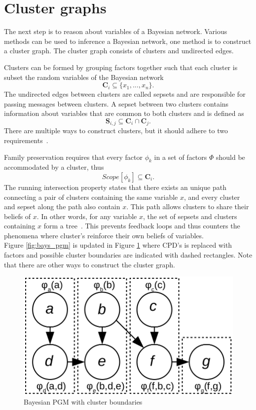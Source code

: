 \documentclass[12pt,oneside,openany,a4paper, %
afrikaans,english,
]{memoir}
\numberwithin{equation}{chapter}
\begin{document}
\section{Cluster graphs}
The next step is to reason about variables of a Bayesian network. Various methods can be used to inference a Bayesian network, one method is to construct a cluster graph. The cluster graph consists of clusters and undirected edges.

Clusters can be formed by grouping factors together such that each cluster is subset the random variables of the Bayesian network
\begin{equation}
\bm{C}_i \subseteq \{x_1, ..., x_n\}.
\end{equation}
The undirected edges between clusters are called sepsets and are responsible for passing messages between clusters. A sepset between two clusters contains information about variables that are common to both clusters and is defined as
\begin{equation}
\bm{S}_{i,j} \subseteq \bm{C}_i \cap \bm{C}_j.
\end{equation}
There are multiple ways to construct clusters, but it should adhere to two requirements~\citep{koller}.

Family preservation requires that every factor $\phi_k$ in a set of factors $\Phi$ should be accommodated by a cluster, thus
\begin{equation}
Scope[{\phi}_k] \subseteq \bm{C}_i.
\end{equation}
The running intersection property states that there exists an unique path connecting a pair of clusters containing the same variable $x$, and every cluster and sepset along the path also contain $x$. This path allows clusters to share their beliefs of $x$. In other words, for any variable $x$, the set of sepsets and clusters containing $x$ form a tree~\citep{koller}. This prevents feedback loops and thus counters the phenomena where cluster's reinforce their own beliefs of variables.\\
Figure \ref{fig:bays_pgm} is updated in Figure \ref{fig:cluster_bound} where CPD's is replaced with factors and possible cluster boundaries are indicated with dashed rectangles. Note that there are other ways to construct the cluster graph.
\begin{figure}[H]
  \includegraphics[width=0.6\linewidth]{Figures/cluster_divisions.png}
  \centering
  \caption{Bayesian PGM with cluster boundaries}
  \label{fig:cluster_bound}
\end{figure}
\end{document}
